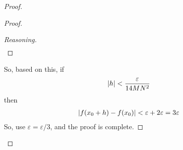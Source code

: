 \begin{proof}
\begin{enumerate}
\begin{proof}
\begin{proof}[Reasoning]
\begin{align}
                \end{align}
            \end{proof}
            So, based on this, if
            \begin{align}
                \abs{h} < \dfrac{\varepsilon}{14MN^2}
            \end{align}
            then
            \begin{align}
                \abs{f(x_0 + h) - f(x_0)} < \varepsilon + 2\varepsilon = 3\varepsilon
            \end{align}
            So, use $\varepsilon = \varepsilon/3$, and the proof is complete.
        \end{proof}
    \end{enumerate}
\end{proof}